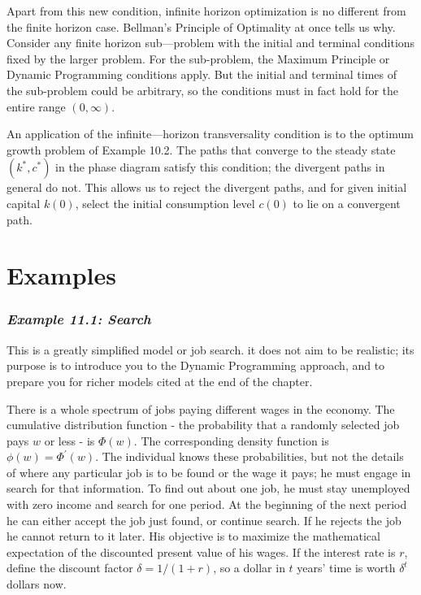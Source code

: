 Apart from this new condition, infinite horizon optimization is no different from the finite horizon case. Bellman's Principle of Optimality at once tells us why. Consider any finite horizon sub—problem with the initial and terminal conditions fixed by the larger problem. For the sub-problem, the Maximum Principle or Dynamic Programming conditions apply. But the initial and terminal times of the sub-problem could be arbitrary, so the conditions must in fact hold for the entire range $(0,\infty)$.

An application of the infinite—horizon transversality condition is to the optimum growth problem of Example 10.2. The paths that converge to the steady state $(k^*,c^*)$ in the phase diagram satisfy this condition; the divergent paths in general do not. This allows us to reject the divergent paths, and for given initial capital $k(0)$, select the initial consumption level $c(0)$ to lie on a convergent path.

\section*{Examples}

\subsubsection*{\textit{Example 11.1: Search}}

This is a greatly simplified model or job search. it does not aim to be realistic; its purpose is to introduce you to the Dynamic Programming approach, and to prepare you for richer models cited at the end of the chapter.

There is a whole spectrum of jobs paying different wages in the economy. The cumulative distribution function - the probability that a randomly selected job pays $w$ or less - is $\Phi(w)$. The corresponding density function is $\phi(w) = \Phi^\prime(w)$. The individual knows these probabilities, but not the details of where any particular job is to be found or the wage it pays; he must engage in search for that information. To find out about one job, he must stay unemployed with zero income and search for one period. At the beginning of the next period he can either accept the job just found, or continue search. If he rejects the job he cannot return to it later. His objective is to maximize the mathematical expectation of the discounted present value of his wages. If the interest rate is $r$, define the discount factor $\delta = 1 / (1 + r)$, so a dollar in $t$ years' time is worth $\delta^t$ dollars now.

